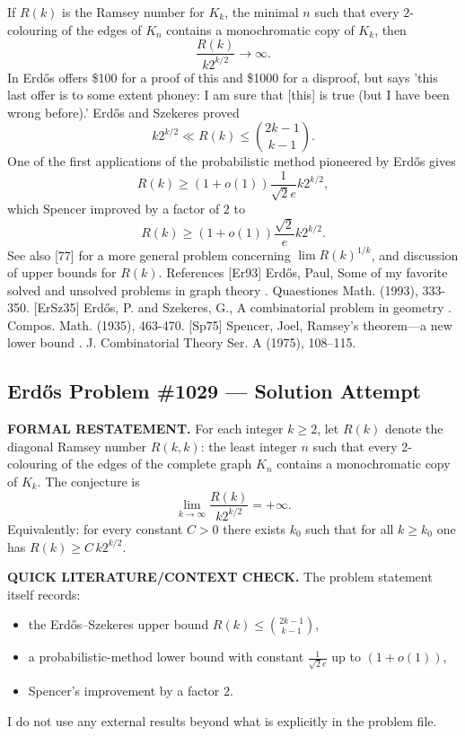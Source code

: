 If $R(k)$ is the Ramsey number for $K_k$, the minimal $n$ such that every $2$-colouring of the edges of $K_n$ contains a monochromatic copy of $K_k$, then\[\frac{R(k)}{k2^{k/2}}\to \infty.\] In \cite{Er93} Erd\H{o}s offers \$100 for a proof of this and \$1000 for a disproof, but says 'this last offer is to some extent phoney: I am sure that [this] is true (but I have been wrong before).' Erd\H{o}s and Szekeres \cite{ErSz35} proved\[k2^{k/2} \ll R(k) \leq \binom{2k-1}{k-1}.\]One of the first applications of the probabilistic method pioneered by Erd\H{o}s gives\[R(k) \geq (1+o(1))\frac{1}{\sqrt{2}e}k2^{k/2},\]which Spencer \cite{Sp75} improved by a factor of $2$ to\[R(k) \geq (1+o(1))\frac{\sqrt{2}}{e}k2^{k/2}.\]See also [77] for a more general problem concerning $\lim R(k)^{1/k}$, and discussion of upper bounds for $R(k)$. References [Er93] Erd\H{o}s, Paul, Some of my favorite solved and unsolved problems in graph theory . Quaestiones Math. (1993), 333-350. [ErSz35] Erd\H{o}s, P. and Szekeres, G., A combinatorial problem in geometry . Compos. Math. (1935), 463-470. [Sp75] Spencer, Joel, Ramsey's theorem---a new lower bound . J. Combinatorial Theory Ser. A (1975), 108--115.

\subsection*{Erd\H{o}s Problem \#1029 --- Solution Attempt}

\textbf{FORMAL RESTATEMENT.}
For each integer $k\ge 2$, let $R(k)$ denote the diagonal Ramsey number $R(k,k)$: the least integer $n$ such that every 2-colouring of the edges of the complete graph $K_n$ contains a monochromatic copy of $K_k$.
The conjecture is
\[
\lim_{k\to\infty} \frac{R(k)}{k2^{k/2}} = +\infty.
\]
Equivalently: for every constant $C>0$ there exists $k_0$ such that for all $k\ge k_0$ one has $R(k)\ge C\,k2^{k/2}$.

\textbf{QUICK LITERATURE/CONTEXT CHECK.}
The problem statement itself records:
\begin{itemize}
\item the Erd\H{o}s--Szekeres upper bound $R(k)\le \binom{2k-1}{k-1}$,
\item a probabilistic-method lower bound with constant $\frac{1}{\sqrt{2}e}$ up to $(1+o(1))$,
\item Spencer's improvement by a factor $2$.
\end{itemize}
I do not use any external results beyond what is explicitly in the problem file.

